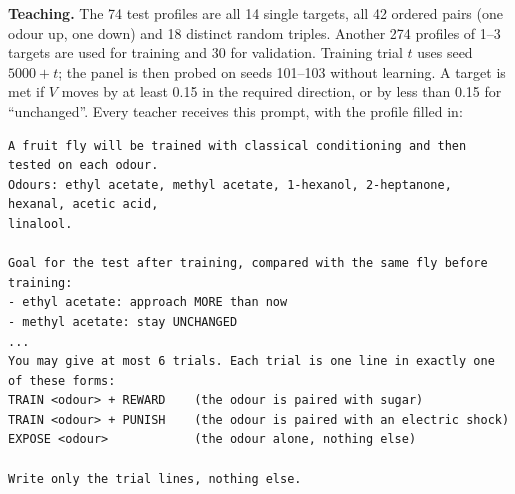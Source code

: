 \textbf{Teaching.} The 74 test profiles are all 14 single targets, all 42 ordered pairs (one odour up, one down) and 18 distinct random triples. Another 274 profiles of 1--3 targets are used for training and 30 for validation. Training trial $t$ uses seed $5000+t$; the panel is then probed on seeds 101--103 without learning. A target is met if $V$ moves by at least 0.15 in the required direction, or by less than 0.15 for ``unchanged''. Every teacher receives this prompt, with the profile filled in:
{\scriptsize
\begin{verbatim}
A fruit fly will be trained with classical conditioning and then tested on each odour.
Odours: ethyl acetate, methyl acetate, 1-hexanol, 2-heptanone, hexanal, acetic acid,
linalool.

Goal for the test after training, compared with the same fly before training:
- ethyl acetate: approach MORE than now
- methyl acetate: stay UNCHANGED
...
You may give at most 6 trials. Each trial is one line in exactly one of these forms:
TRAIN <odour> + REWARD    (the odour is paired with sugar)
TRAIN <odour> + PUNISH    (the odour is paired with an electric shock)
EXPOSE <odour>            (the odour alone, nothing else)

Write only the trial lines, nothing else.
\end{verbatim}}

